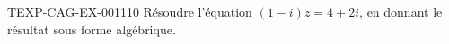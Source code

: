 \begin{exercice}{TEXP-CAG-EX-001}{1}{10}
Résoudre l'équation $(1-i)z = 4+2i$, en donnant le résultat sous forme algébrique.
\end{exercice}
